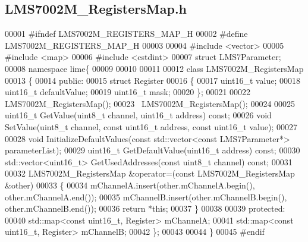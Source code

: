 \subsection{L\+M\+S7002\+M\+\_\+\+Registers\+Map.\+h}
\label{LMS7002M__RegistersMap_8h_source}

\begin{DoxyCode}
00001 \textcolor{preprocessor}{#ifndef LMS7002M\_REGISTERS\_MAP\_H}
00002 \textcolor{preprocessor}{#define LMS7002M\_REGISTERS\_MAP\_H}
00003 
00004 \textcolor{preprocessor}{#include <vector>}
00005 \textcolor{preprocessor}{#include <map>}
00006 \textcolor{preprocessor}{#include <cstdint>}
00007 \textcolor{keyword}{struct }LMS7Parameter;
00008 \textcolor{keyword}{namespace }lime\{
00009 
00010 
00011 
00012 \textcolor{keyword}{class }LMS7002M_RegistersMap
00013 \{
00014 \textcolor{keyword}{public}:
00015     \textcolor{keyword}{struct }Register
00016     \{
00017         uint16\_t value;
00018         uint16\_t defaultValue;
00019         uint16\_t mask;
00020     \};
00021 
00022     LMS7002M_RegistersMap();
00023     ~LMS7002M_RegistersMap();
00024 
00025     uint16\_t GetValue(uint8\_t channel, uint16\_t address) \textcolor{keyword}{const};
00026     \textcolor{keywordtype}{void} SetValue(uint8\_t channel, \textcolor{keyword}{const} uint16\_t address, \textcolor{keyword}{const} uint16\_t value);
00027 
00028     \textcolor{keywordtype}{void} InitializeDefaultValues(\textcolor{keyword}{const} std::vector<const LMS7Parameter*> parameterList);
00029     uint16\_t GetDefaultValue(uint16\_t address) \textcolor{keyword}{const};
00030     std::vector<uint16\_t> GetUsedAddresses(\textcolor{keyword}{const} uint8\_t channel) \textcolor{keyword}{const};
00031 
00032     LMS7002M_RegistersMap &operator=(\textcolor{keyword}{const} LMS7002M_RegistersMap &other)
00033     \{
00034         mChannelA.insert(other.mChannelA.begin(), other.mChannelA.end());
00035         mChannelB.insert(other.mChannelB.begin(), other.mChannelB.end());
00036         \textcolor{keywordflow}{return} *\textcolor{keyword}{this};
00037     \}
00038 
00039 \textcolor{keyword}{protected}:
00040     std::map<const uint16\_t, Register> mChannelA;
00041     std::map<const uint16\_t, Register> mChannelB;
00042 \};
00043 
00044 \}
00045 \textcolor{preprocessor}{#endif}
\end{DoxyCode}
